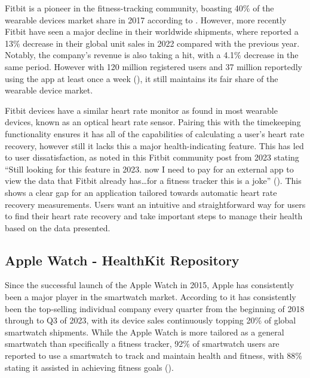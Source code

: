 \documentclass{l4proj}
\begin{document}
Fitbit is a pioneer in the fitness-tracking community, boasting 40\% of the wearable devices market share in 2017 according to \cite{MarketShare2023}. However, more recently Fitbit have seen a major decline in their worldwide shipments, where \cite{Fitbit2024} reported a 13\% decrease in their global unit sales in 2022 compared with the previous year. Notably, the company’s revenue is also taking a hit, with a 4.1\% decrease in the same period. However with 120 million registered users and 37 million reportedly using the app at least once a week (\cite{Fitbit2024}), it still maintains its fair share of the wearable device market.

Fitbit devices have a similar heart rate monitor as found in most wearable devices, known as an optical heart rate sensor. Pairing this with the timekeeping functionality ensures it has all of the capabilities of calculating a user’s heart rate recovery, however still it lacks this a major health-indicating feature. This has led to user dissatisfaction, as noted in this Fitbit community post from 2023 stating “Still looking for this feature in 2023. now I need to pay for an external app to view the data that Fitbit already has…for a fitness tracker this is a joke” (\cite{FitbitReview}). This shows a clear gap for an application tailored towards automatic heart rate recovery measurements. Users want an intuitive and straightforward way for users to find their heart rate recovery and take important steps to manage their health based on the data presented.

\subsection{Apple Watch - HealthKit Repository}
\label{sec:applewatch}

Since the successful launch of the Apple Watch in 2015, Apple has consistently been a major player in the smartwatch market. According to \cite{MarketShare2024} it has consistently been the top-selling individual company every quarter from the beginning of 2018 through to Q3 of 2023, with its device sales continuously topping 20\% of global smartwatch shipments. While the Apple Watch is more tailored as a general smartwatch than specifically a fitness tracker, 92\% of smartwatch users are reported to use a smartwatch to track and maintain health and fitness, with 88\% stating it assisted in achieving fitness goals (\cite{Shewale_2023}).
\end{document}
